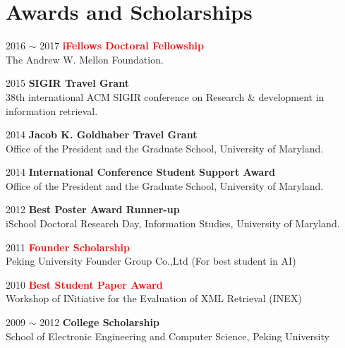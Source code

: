 \documentclass[a4paper, 11pt]{article}
\newcommand{\red}[1]{\textcolor{red}{#1}}
\begin{document}
\section{Awards and Scholarships}
\begin{CV}
\item [2016 $\sim$ 2017] {\red{\textbf{iFellows Doctoral Fellowship}} \\ The Andrew W. Mellon Foundation.}\vspace{2mm}

\item[2015]{\textbf{SIGIR Travel Grant}\\ 38th international ACM SIGIR conference on Research \& development in information retrieval.}
\vspace{2mm}

\item[2014]{\textbf{Jacob K. Goldhaber Travel Grant}\\ Office of the President and the Graduate School, University of Maryland.}
\vspace{2mm}

\item[2014]{\textbf{International Conference Student Support Award}\\ Office of the President and the Graduate School, University of Maryland.}
\vspace{2mm}

        \item[2012]{\textbf{Best Poster Award Runner-up}\\ iSchool Doctoral Research Day, Information Studies, University of Maryland.}
        \vspace{2mm}

        \item[2011]{\red{\textbf{Founder Scholarship}}\\ Peking University Founder Group Co.,Ltd (For best student in AI)}
        \vspace{2mm}

        \item[2010]{\red{\textbf{Best Student Paper Award}}\\ Workshop of INitiative for the Evaluation of XML Retrieval (INEX)}
        \vspace{2mm}

        \item[2009 $\sim$ 2012]{\textbf{College Scholarship}\\ School of Electronic Engineering and Computer Science, Peking University}

\end{CV}
\end{document}

